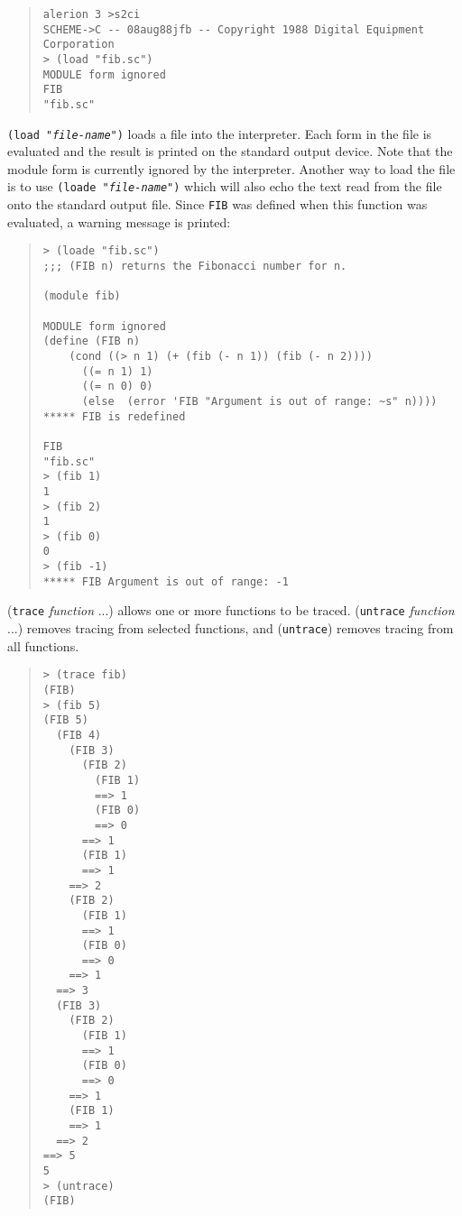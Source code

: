 \documentclass[11pt]{article}
\begin{document}
\begin{small}
\begin{quote}
\begin{verbatim}
alerion 3 >s2ci
SCHEME->C -- 08aug88jfb -- Copyright 1988 Digital Equipment Corporation
> (load "fib.sc")
MODULE form ignored
FIB
"fib.sc"
\end{verbatim}
\end{quote}
\end{small}

\texttt{(load "\textnormal{\emph{file-name}}")} loads a file into the
interpreter.  Each
form in the file is evaluated and the result is printed on the
standard output device.  Note that the module form is currently
ignored by the interpreter.  Another way to load the file is to use
\texttt{(loade "\textnormal{\emph{file-name}}")} which will also echo the text read from
the file onto the standard output file.  Since \texttt{FIB} was defined
when this function was evaluated, a warning message is printed:

\begin{small}
\begin{quote}
\begin{verbatim}
> (loade "fib.sc")
;;; (FIB n) returns the Fibonacci number for n.

(module fib)

MODULE form ignored
(define (FIB n)
    (cond ((> n 1) (+ (fib (- n 1)) (fib (- n 2))))
	  ((= n 1) 1)
	  ((= n 0) 0)
	  (else  (error 'FIB "Argument is out of range: ~s" n))))
***** FIB is redefined

FIB
"fib.sc"
> (fib 1)
1
> (fib 2)
1
> (fib 0)
0
> (fib -1)
***** FIB Argument is out of range: -1
\end{verbatim}
\end{quote}
\end{small}

(\texttt{trace} \emph{function} ...) allows one or more functions to be
traced. (\texttt{untrace} \emph{function} ...) removes tracing from selected
functions, and (\texttt{untrace}) removes tracing from all functions.

\begin{small}
\begin{quote}
\begin{verbatim}
> (trace fib)
(FIB)
> (fib 5)
(FIB 5)
  (FIB 4)
    (FIB 3)
      (FIB 2)
        (FIB 1)
        ==> 1
        (FIB 0)
        ==> 0
      ==> 1
      (FIB 1)
      ==> 1
    ==> 2
    (FIB 2)
      (FIB 1)
      ==> 1
      (FIB 0)
      ==> 0
    ==> 1
  ==> 3
  (FIB 3)
    (FIB 2)
      (FIB 1)
      ==> 1
      (FIB 0)
      ==> 0
    ==> 1
    (FIB 1)
    ==> 1
  ==> 2
==> 5
5
> (untrace)
(FIB)
\end{verbatim}
\end{quote}
\end{small}
\end{document}
